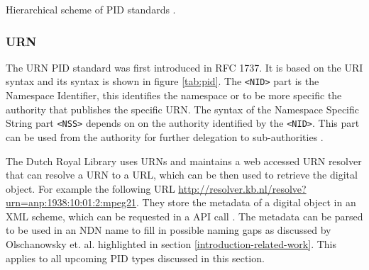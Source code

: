 \begin {table}[H]
\caption {Hierarchical scheme of PID standards \cite{icn-bd}.} \label{tab:pid} 
\begin{center}
\end{center}
\end {table}



\subsubsection{URN}
The URN PID standard was first introduced in RFC 1737. It is based on the URI syntax and its syntax is shown in figure \ref{tab:pid}. The \texttt{\textless NID\textgreater} part is the Namespace Identifier, this identifies the namespace or to be more specific the authority that publishes the specific URN.
The syntax of the Namespace Specific String part \texttt{\textless NSS\textgreater} depends on on the authority identified by the \texttt{\textless NID\textgreater}. This part can be used from the authority for further delegation to sub-authorities \cite{icn-bd}.

The Dutch Royal Library uses URNs and maintains a web accessed URN resolver that can resolve a URN to a URL, which can be then used to retrieve the digital object. For example the following URL \url{http://resolver.kb.nl/resolve?urn=anp:1938:10:01:2:mpeg21}. 
They store the metadata of a digital object in an XML scheme, which can be requested in a API call \cite{kb-urn}. The metadata can be parsed to be used in an NDN name to fill in possible naming gaps as discussed by Olschanowsky et. al. \cite{ndn-clim} highlighted in section \ref{introduction-related-work}. This applies to all upcoming PID types discussed in this section.


